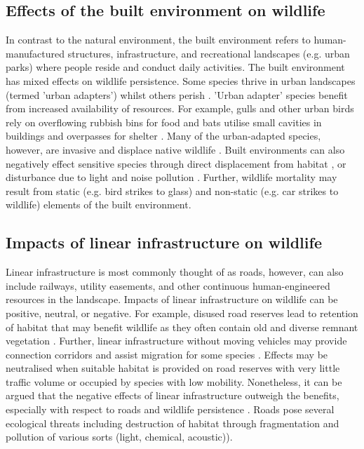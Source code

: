 \subsection{Effects of the built environment on wildlife}

In contrast to the natural environment, the built environment refers to human-manufactured structures, infrastructure, and recreational landscapes (e.g. urban parks) where people reside and conduct daily activities.  The built environment has mixed effects on wildlife persistence. Some species thrive in urban landscapes (termed 'urban adapters') whilst others perish \citep{shoc06}. 'Urban adapter' species benefit from increased availability of resources. For example, gulls and other urban birds rely on overflowing rubbish bins for food \citep{ditc06} and bats utilise small cavities in buildings and overpasses for shelter \citep{kunz82}. Many of the urban-adapted species, however, are invasive and displace native wildlife \citep{mcki06}. Built environments can also negatively effect sensitive species through direct displacement from habitat \citep{czec97}, or disturbance due to light and noise pollution \citep{parr16}. Further, wildlife mortality may result from static (e.g. bird strikes to glass) and non-static (e.g. car strikes to wildlife) elements of the built environment. 

\subsection{Impacts of linear infrastructure on wildlife}

Linear infrastructure is most commonly thought of as roads, however, can also include railways, utility easements, and other continuous human-engineered resources in the landscape. Impacts of linear infrastructure on wildlife can be positive, neutral, or negative. For example, disused road reserves lead to retention of habitat that may benefit wildlife as they often contain old and diverse remnant vegetation \citep{benn91}. Further, linear infrastructure without moving vehicles may provide connection corridors and assist migration for some species \citep{rvdr15}. Effects may be neutralised when suitable habitat is provided on road reserves with very little traffic volume or occupied by species with low mobility. Nonetheless, it can be argued that the negative effects of linear infrastructure outweigh the benefits, especially with respect to roads and wildlife persistence \citep{fahr09}. Roads pose several ecological threats including destruction of habitat through fragmentation and pollution of various sorts (light, chemical, acoustic)).

